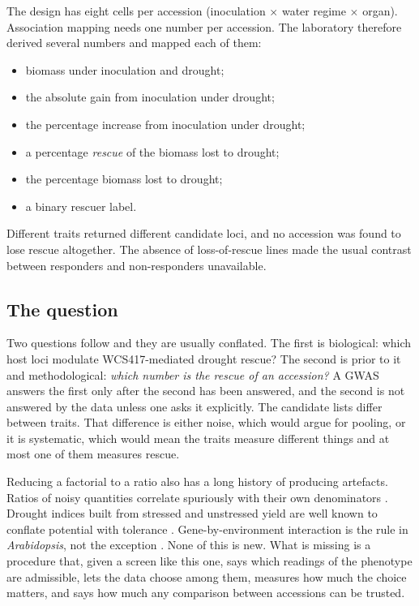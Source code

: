 \documentclass[10pt,twocolumn,a4paper]{article}
\theoremstyle{definition}
\theoremstyle{remark}
\begin{document}
The design has eight cells per accession (inoculation $\times$ water
regime $\times$ organ). Association mapping needs one number per
accession. The laboratory therefore derived several numbers and mapped
each of them:
\begin{itemize}[leftmargin=1.3em,itemsep=1pt]
  \item biomass under inoculation and drought;
  \item the absolute gain from inoculation under drought;
  \item the percentage increase from inoculation under drought;
  \item a percentage \emph{rescue} of the biomass lost to drought;
  \item the percentage biomass lost to drought;
  \item a binary rescuer label.
\end{itemize}
Different traits returned different candidate loci, and no accession was
found to lose rescue altogether. The absence of loss-of-rescue lines made
the usual contrast between responders and non-responders unavailable.

\subsection{The question}

Two questions follow and they are usually conflated. The first is
biological: which host loci modulate WCS417-mediated drought rescue? The
second is prior to it and methodological: \emph{which number is the
rescue of an accession?} A GWAS answers the first only after the second
has been answered, and the second is not answered by the data unless one
asks it explicitly. The candidate lists differ between traits. That
difference is either noise, which would argue for pooling, or it is
systematic, which would mean the traits measure different things and at
most one of them measures rescue.

Reducing a factorial to a ratio also has a long history of producing
artefacts. Ratios of noisy quantities correlate spuriously with their
own denominators \citep{pearson1897,kronmal1993}. Drought indices built
from stressed and unstressed yield are well known to conflate potential
with tolerance \citep{fischer1978,verslues2006}. Gene-by-environment
interaction is the rule in \emph{Arabidopsis}, not the exception
\citep{elsoda2014,desmarais2013}. None of this is new. What is missing is
a procedure that, given a screen like this one, says which readings of
the phenotype are admissible, lets the data choose among them, measures
how much the choice matters, and says how much any comparison between
accessions can be trusted.
\end{document}
